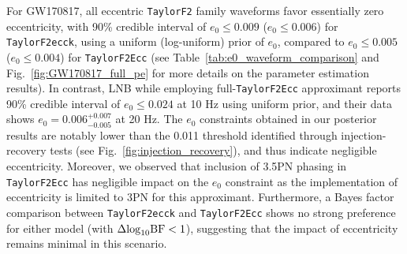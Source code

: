 \documentclass[aps,prd,twocolumn,superscriptaddress,groupedaddress,nofootinbib,showpacs,eqsecnum,useAms]{revtex4-2}
\begin{document}

For GW170817, all eccentric \texttt{TaylorF2} family waveforms favor essentially zero eccentricity, with 90\% credible interval of $e_0\leq0.009$ ($e_0\leq0.006$) for \texttt{TaylorF2ecck}, using a uniform (log-uniform) prior of $e_0$, compared to $e_0\leq0.005$ ($e_0\leq0.004$) for \texttt{TaylorF2Ecc} (see Table~\ref{tab:e0_waveform_comparison} and Fig.~\ref{fig:GW170817_full_pe} for more details on the parameter estimation results). 
In contrast, LNB while employing full-\texttt{TaylorF2Ecc} approximant reports 90\% credible interval of $e_0 \leq 0.024$ at 10 Hz using uniform prior, and their data shows $e_0 = 0.006^{+0.007}_{-0.005}$ at 20 Hz. 
The $e_0$ constraints obtained in our posterior results are notably lower than the 0.011 threshold identified through injection-recovery tests (see Fig.~\ref{fig:injection_recovery}), and thus indicate negligible eccentricity. 
Moreover, we observed that inclusion of 3.5PN phasing in \texttt{TaylorF2Ecc} has negligible impact on the $e_0$ constraint as the implementation of eccentricity is limited to 3PN for this approximant.
 Furthermore, a Bayes factor comparison between \texttt{TaylorF2ecck} and \texttt{TaylorF2Ecc} shows no strong preference for either model (with $\Delta{\rm log}_{10}{\rm BF} < 1$), suggesting that the impact of eccentricity remains minimal in this scenario.
\end{document}
